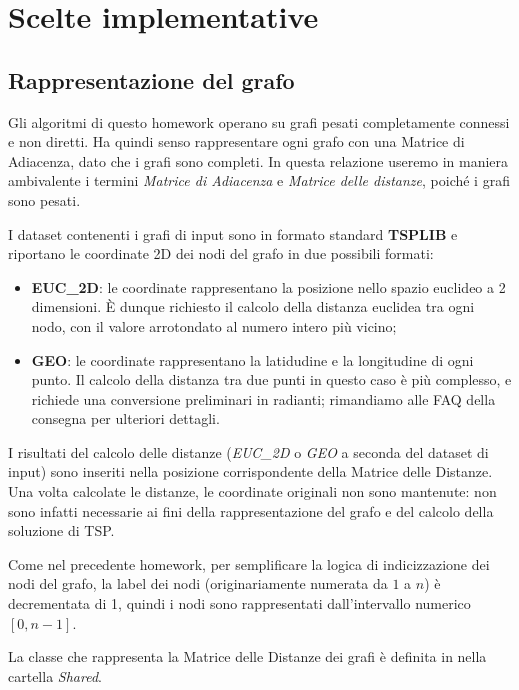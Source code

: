 \section{Scelte implementative}
\label{cap:implementation-choices}

\subsection{Rappresentazione del grafo}
\label{sub:graph-representation}

Gli algoritmi di questo homework operano su grafi pesati completamente connessi e non diretti. Ha quindi senso rappresentare ogni grafo con una Matrice di Adiacenza, dato che i grafi sono completi. In questa relazione useremo in maniera ambivalente i termini \textit{Matrice di Adiacenza} e \textit{Matrice delle distanze}, poiché i grafi sono pesati.

\noindent I dataset contenenti i grafi di input sono in formato standard \textbf{TSPLIB } e riportano le coordinate 2D dei nodi del grafo in due possibili formati:

\begin{itemize}
    \item \textbf{EUC\_2D}: le coordinate rappresentano la posizione nello spazio euclideo a 2 dimensioni. È dunque richiesto il calcolo della distanza euclidea tra ogni nodo, con il valore arrotondato al numero intero più vicino;
    \item \textbf{GEO}: le coordinate rappresentano la latidudine e la longitudine di ogni punto. Il calcolo della distanza tra due punti in questo caso è più complesso, e richiede una conversione preliminari in radianti; rimandiamo alle FAQ della consegna per ulteriori dettagli.
\end{itemize}

\noindent I risultati del calcolo delle distanze (\textit{EUC\_2D} o \textit{GEO} a seconda del dataset di input) sono inseriti nella posizione corrispondente della Matrice delle Distanze.
Una volta calcolate le distanze, le coordinate originali non sono mantenute: non sono infatti necessarie ai fini della rappresentazione del grafo e del calcolo della soluzione di TSP.

\noindent Come nel precedente homework, per semplificare la logica di indicizzazione dei nodi del grafo, la label dei nodi (originariamente numerata da $1$ a $n$) è decrementata di 1, quindi i nodi sono rappresentati dall'intervallo numerico $[0, n-1]$.

\noindent La classe che rappresenta la Matrice delle Distanze dei grafi è definita in  nella cartella \textit{Shared}.

